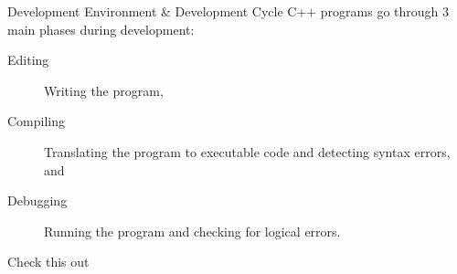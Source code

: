 \documentclass[../lecture1-introduction.tex]{subfiles}
\begin{document}
\begin{frame}[fragile]{Development Environment \& Development Cycle}
    C++ programs go through 3 main phases during development:
    \begin{description}
        \item [Editing] Writing the program,
        \item [Compiling] Translating the program to executable code and detecting
        syntax errors, and
        \item [Debugging] Running the program and checking for logical errors.
    \end{description}
\end{frame}


\begin{frame}[fragile]{Check this out}
    \begin{center}
    \end{center}
\end{frame}

\end{document}
